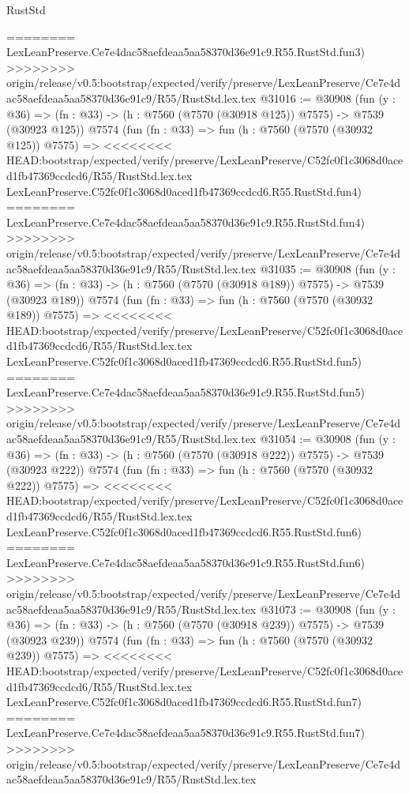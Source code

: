 \begin{lexlean}{RustStd}
\begin{coremodule}
{\begin{coremodule}
{{{{{{{{{{{{{{{{{{{{{{{{{{{{{{{{{{{{{{{{{{{========
    LexLeanPreserve.Ce7e4dac58aefdeaa5aa58370d36e91c9.R55.RustStd.fun3)
>>>>>>>> origin/release/v0.5:bootstrap/expected/verify/preserve/LexLeanPreserve/Ce7e4dac58aefdeaa5aa58370d36e91c9/R55/RustStd.lex.tex
@31016 := @30908
    (fun (y : @36) => (fn : @33) -> (h : @7560 (@7570 (@30918 @125)) @7575) -> @7539 (@30923 @125))
    @7574
    (fun (fn : @33) =>
    fun (h : @7560 (@7570 (@30932 @125)) @7575) =>
<<<<<<<< HEAD:bootstrap/expected/verify/preserve/LexLeanPreserve/C52fc0f1c3068d0aced1fb47369ccdcd6/R55/RustStd.lex.tex
    LexLeanPreserve.C52fc0f1c3068d0aced1fb47369ccdcd6.R55.RustStd.fun4)
========
    LexLeanPreserve.Ce7e4dac58aefdeaa5aa58370d36e91c9.R55.RustStd.fun4)
>>>>>>>> origin/release/v0.5:bootstrap/expected/verify/preserve/LexLeanPreserve/Ce7e4dac58aefdeaa5aa58370d36e91c9/R55/RustStd.lex.tex
@31035 := @30908
    (fun (y : @36) => (fn : @33) -> (h : @7560 (@7570 (@30918 @189)) @7575) -> @7539 (@30923 @189))
    @7574
    (fun (fn : @33) =>
    fun (h : @7560 (@7570 (@30932 @189)) @7575) =>
<<<<<<<< HEAD:bootstrap/expected/verify/preserve/LexLeanPreserve/C52fc0f1c3068d0aced1fb47369ccdcd6/R55/RustStd.lex.tex
    LexLeanPreserve.C52fc0f1c3068d0aced1fb47369ccdcd6.R55.RustStd.fun5)
========
    LexLeanPreserve.Ce7e4dac58aefdeaa5aa58370d36e91c9.R55.RustStd.fun5)
>>>>>>>> origin/release/v0.5:bootstrap/expected/verify/preserve/LexLeanPreserve/Ce7e4dac58aefdeaa5aa58370d36e91c9/R55/RustStd.lex.tex
@31054 := @30908
    (fun (y : @36) => (fn : @33) -> (h : @7560 (@7570 (@30918 @222)) @7575) -> @7539 (@30923 @222))
    @7574
    (fun (fn : @33) =>
    fun (h : @7560 (@7570 (@30932 @222)) @7575) =>
<<<<<<<< HEAD:bootstrap/expected/verify/preserve/LexLeanPreserve/C52fc0f1c3068d0aced1fb47369ccdcd6/R55/RustStd.lex.tex
    LexLeanPreserve.C52fc0f1c3068d0aced1fb47369ccdcd6.R55.RustStd.fun6)
========
    LexLeanPreserve.Ce7e4dac58aefdeaa5aa58370d36e91c9.R55.RustStd.fun6)
>>>>>>>> origin/release/v0.5:bootstrap/expected/verify/preserve/LexLeanPreserve/Ce7e4dac58aefdeaa5aa58370d36e91c9/R55/RustStd.lex.tex
@31073 := @30908
    (fun (y : @36) => (fn : @33) -> (h : @7560 (@7570 (@30918 @239)) @7575) -> @7539 (@30923 @239))
    @7574
    (fun (fn : @33) =>
    fun (h : @7560 (@7570 (@30932 @239)) @7575) =>
<<<<<<<< HEAD:bootstrap/expected/verify/preserve/LexLeanPreserve/C52fc0f1c3068d0aced1fb47369ccdcd6/R55/RustStd.lex.tex
    LexLeanPreserve.C52fc0f1c3068d0aced1fb47369ccdcd6.R55.RustStd.fun7)
========
    LexLeanPreserve.Ce7e4dac58aefdeaa5aa58370d36e91c9.R55.RustStd.fun7)
>>>>>>>> origin/release/v0.5:bootstrap/expected/verify/preserve/LexLeanPreserve/Ce7e4dac58aefdeaa5aa58370d36e91c9/R55/RustStd.lex.tex
}}}}}}}}}}}}}}}}}}}}}}}}}}}}}}}}}}}}}}}}}}}
\end{coremodule}}
\end{coremodule}
\end{lexlean}
